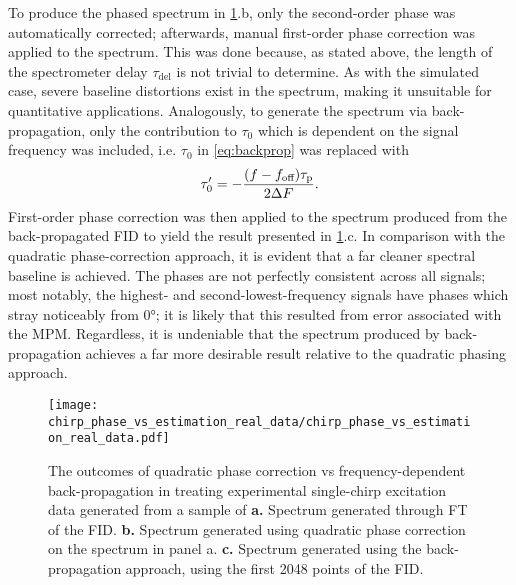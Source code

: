 To produce the phased spectrum in \cref{fig:bbqchili-real}.b, only the
second-order phase was automatically corrected; afterwards, manual
first-order phase correction was applied to the spectrum. This was done
because, as stated above, the
length of the spectrometer delay $\tau_{\text{del}}$ is not trivial to
determine. As with the simulated case, severe baseline distortions exist in the
spectrum, making it unsuitable for quantitative applications.
Analogously, to generate the spectrum via back-propagation, only the
contribution to $\tau_0$ which is dependent on the signal frequency was
included, i.e. $\tau_0$ in \cref{eq:backprop} was replaced with
\begin{equation}
    \tau_{0}^{\prime} = -\frac{(f - f_{\text{off}}) \tau_{\text{p}}}{2 \Delta F}.
\end{equation}
First-order phase correction was then applied to the spectrum produced from the
back-propagated \ac{FID} to yield the result presented in
\cref{fig:bbqchili-real}.c.
In comparison with the quadratic phase-correction approach, it is evident that
a far cleaner spectral baseline is achieved. The phases are not perfectly
consistent across all signals; most notably, the highest- and
second-lowest-frequency signals have phases which stray noticeably from
\ang{0}; it is likely that this resulted from error associated with the
\ac{MPM}. Regardless, it is undeniable that the spectrum produced by
back-propagation achieves a far more desirable result relative to the quadratic
phasing approach.

\begin{figure}
    \centering
    \texttt{[image: chirp\_phase\_vs\_estimation\_real\_data/chirp\_phase\_vs\_estimation\_real\_data.pdf]}
    \caption[
        The outcomes of quadratic phase correction vs frequency-dependent
        back-propagation in treating experimental single-chirp excitation data
        generated from a sample of Gd-doped H\textsubscript{2}O in
        D\textsubscript{2}O.
    ]{
        The outcomes of quadratic phase correction vs frequency-dependent
        back-propagation in treating experimental single-chirp excitation data
        generated from a sample of
        \label{corr:chirp-exp-desc}%
        \textbf{a.} Spectrum generated through \ac{FT} of the \ac{FID}.
        \textbf{b.} Spectrum generated using quadratic phase correction on the
        spectrum in panel a.
        \textbf{c.} Spectrum generated using the back-propagation approach,
        using the first 2048 points of the \ac{FID}.
    }
    \label{fig:bbqchili-real}
\end{figure}
